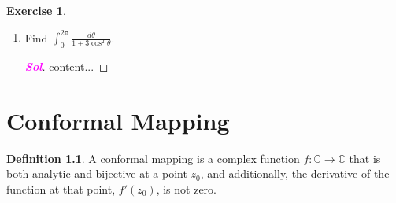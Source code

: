 \documentclass[12pt,openany]{book}
\theoremstyle{definition}
\newtheorem{definition}{Definition}[chapter]
\newtheorem{exercise}{Exercise}[section]
\newcommand{\sol}{\textcolor{magenta}{\bf Sol}}
\begin{document}
\begin{exercise}
\begin{enumerate}
\begin{proof}[\sol]
\begin{center}
				\end{center} where \begin{align*}
					C_R&: z(\theta)=Re^{i\theta}\quad(\theta\in[0,\pi]),\\
					L_1&: [-R,\rho],\\
					L_2&: [\rho,R],\\
					C_\rho&: z(t)=\rho e^{i(\pi-t)}\quad(t\in[0,\pi]).
				\end{align*} Then \[
				\oint_C f(z)e^{iz}\ dz=0
				\] by the Cauchy-Goursat Theorem. Consider \[
				0=\oint_C f(z)e^{iz}\ dz=\underbrace{\int_{C_R}f(z)e^{iz}\ dz}_{=(1)}+\underbrace{\int_{L_1\cup L_2}f(z)e^{iz}\ dz}_{=(2)}+\underbrace{\int_{C_\rho}f(z)e^{iz}\ dz}_{(3)}
				\]
			\end{proof}
			\newpage
			\item Find $\displaystyle\int_{0}^{2\pi}\frac{d\theta}{1+3\cos^2\theta}$.
			\begin{proof}[\sol]
				content...
			\end{proof}
		\end{enumerate}
	\end{exercise}
	
	\newpage
	\chapter{Conformal Mapping}
	\begin{tcolorbox}[colback=white,colframe=defcolor,arc=5pt,title={\color{white}\bf Conformal}]
		\begin{definition}
			A conformal mapping is a complex function $f: \mathbb{C} \to \mathbb{C}$ that is both analytic and bijective at a point $z_0$, and additionally, the derivative of the function at that point, $f'(z_0)$, is not zero.
		\end{definition}
	\end{tcolorbox}
	
\end{document}
